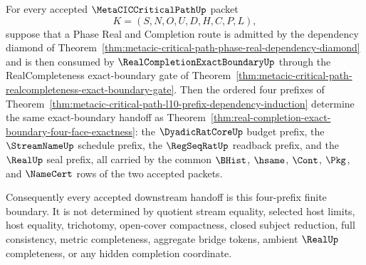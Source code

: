 \begin{theorem}
\label{thm:metacic-critical-path-exact-boundary-prefix-determinacy}
For every accepted $\MetaCICCriticalPathUp$ packet
$$
K=(S,N,O,U,D,H,C,P,L),
$$
suppose that a Phase Real and Completion route is admitted by the dependency diamond of Theorem~\ref{thm:metacic-critical-path-phase-real-dependency-diamond} and is then consumed by $\RealCompletionExactBoundaryUp$ through the RealCompleteness exact-boundary gate of Theorem~\ref{thm:metacic-critical-path-realcompleteness-exact-boundary-gate}. Then the ordered four prefixes of Theorem~\ref{thm:metacic-critical-path-l10-prefix-dependency-induction} determine the same exact-boundary handoff as Theorem~\ref{thm:real-completion-exact-boundary-four-face-exactness}: the $\DyadicRatCoreUp$ budget prefix, the $\StreamNameUp$ schedule prefix, the $\RegSeqRatUp$ readback prefix, and the $\RealUp$ seal prefix, all carried by the common $\BHist$, $\hsame$, $\Cont$, $\Pkg$, and $\NameCert$ rows of the two accepted packets.

Consequently every accepted downstream handoff is this four-prefix finite boundary. It is not determined by quotient stream equality, selected host limits, host equality, trichotomy, open-cover compactness, closed subject reduction, full consistency, metric completeness, aggregate bridge tokens, ambient $\RealUp$ completeness, or any hidden completion coordinate.
\end{theorem}
